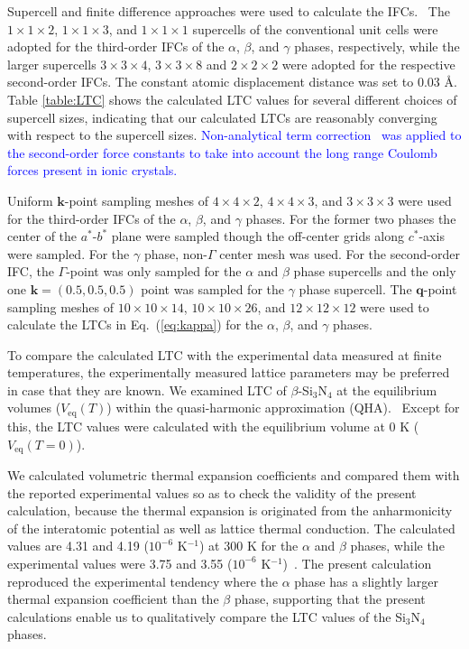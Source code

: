 \documentclass[twocolumn,amsmath,amssymb,a4paper,prb,superscriptaddress,floatfix]{revtex4-1}
\begin{document}
Supercell and finite difference approaches were used to calculate the
IFCs.~\cite{wei-supercell} The $1\times 1\times2$, $1\times 1\times3$, and $1\times
1\times1$ supercells of the conventional unit cells were adopted for the
third-order IFCs of the $\alpha$, $\beta$, and $\gamma$ phases,
respectively, while the larger supercells $3\times 3\times4$, $3\times
3\times8$ and $2\times 2\times2$ were adopted for the respective
second-order IFCs. The constant atomic displacement distance was set to
0.03 \AA. Table \ref{table:LTC} shows the calculated LTC values for
several different choices of supercell sizes, indicating that our
calculated LTCs are reasonably converging with respect to the supercell
sizes. \textcolor{blue}{Non-analytical term correction~\cite{wang} was applied to the second-order 
force constants to take into account the long range Coulomb forces present in ionic crystals.~\cite{phono3py}}

Uniform $\mathbf{k}$-point sampling meshes of $4\times 4\times 2$,
$4\times 4\times 3$, and $3\times 3\times 3$ were used for the
third-order IFCs of the $\alpha$, $\beta$, and $\gamma$ phases. For the
former two phases the center of the $a^*$-$b^*$ plane were sampled
though the off-center grids along $c^*$-axis were sampled. For the
$\gamma$ phase, non-$\Gamma$ center mesh was used. For the second-order
IFC, the $\Gamma$-point was only sampled for the $\alpha$ and $\beta$
phase supercells and the only one $\mathbf{k}=(0.5, 0.5, 0.5)$ point was
sampled for the $\gamma$ phase supercell. The $\mathbf{q}$-point
sampling meshes of $10\times 10\times 14$, $10\times 10\times 26$, and
$12\times 12\times 12$ were used to calculate the LTCs in Eq.~(\ref{eq:kappa})
for the $\alpha$, $\beta$, and $\gamma$ phases.

To compare the calculated LTC with the experimental data measured at
finite temperatures, the experimentally measured lattice parameters may 
be preferred in case that they are known. We examined LTC of
$\beta$-Si$_3$N$_4$ at the equilibrium volumes ($V_\text{eq}(T)$) within the
quasi-harmonic approximation (QHA).~\cite{dove-p76} Except for this, the LTC values
were calculated with the equilibrium volume at 0 K ($V_\text{eq}(T=0)$).

We calculated volumetric thermal expansion coefficients and compared them with
the reported experimental values so as to check the validity of the present
calculation, because the thermal expansion is originated from the anharmonicity
of the interatomic potential as well as lattice thermal conduction. The
calculated values are 4.31 and 4.19 ($10^{-6}$ K$^{-1}$) at 300 K for the
$\alpha$ and $\beta$ phases, while the experimental values were 3.75 and 3.55
($10^{-6}$ K$^{-1}$)~\cite{minikayev-alpha}. The present calculation reproduced
the experimental tendency where the $\alpha$ phase has a slightly larger
thermal expansion coefficient than the $\beta$ phase, supporting that the
present calculations enable us to qualitatively compare the LTC values of the
Si$_3$N$_4$ phases.
\end{document}
